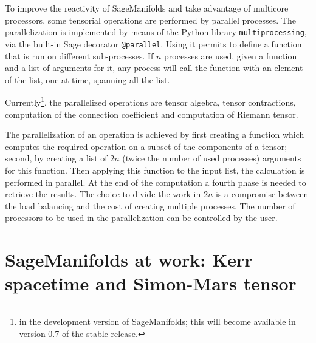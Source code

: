 \documentclass[a4paper]{jpconf}
\newcommand{\soft}[1]{\textsf{#1}}
\newcommand{\code}[1]{\texttt{#1}}
\newcommand{\Sage}{\soft{Sage}}
\newcommand{\SM}{\soft{SageManifolds}}
\begin{document}
To improve the reactivity of \SM{} and take advantage of
multicore processors, some tensorial operations are performed by
parallel processes. The parallelization is implemented by means of
the Python library \code{multiprocessing}, via the built-in
\Sage{} decorator \code{@parallel}. Using it permits to define a function
that is run on different sub-processes. If $n$ processes are used, given a function
and a list of arguments for it, any process will call the function
with an element of the list, one at time, spanning all the list.

Currently\footnote{in the development version of \SM{}; this
will become available in version 0.7 of the stable release.},
the parallelized operations are tensor algebra, tensor
contractions, computation of the connection coefficient
and computation of Riemann tensor.

The parallelization of an operation is achieved by first creating a
function which computes the required operation on a subset of the
components of a tensor; second, by creating a list of $2n$ (twice the
number of used processes) arguments for this function. Then applying this function
to the input list, the calculation is performed in parallel. 
At the end of the computation a fourth phase is needed to retrieve the
results.
The choice to divide the work in $2n$ is a compromise between the 
load balancing and the cost of creating multiple processes.
The number of processors to be used in the parallelization can be controlled by the
user. 




\section{SageManifolds at work: Kerr spacetime and Simon-Mars tensor}
\end{document}
